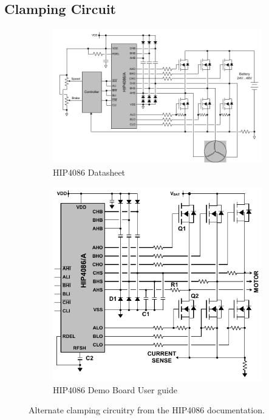 \documentclass{article}
\begin{document}
\subsection{Clamping Circuit}
\begin{figure}[h]
	\centering
	\begin{subfigure}{0.5\textwidth}
		\includegraphics[width=\textwidth]{clamp1}
		\caption{HIP4086 Datasheet}
	\end{subfigure}
	\quad
	\begin{subfigure}{0.35\textwidth}
		\includegraphics[width=\textwidth]{clamp2}
		\caption{HIP4086 Demo Board User guide}
	\end{subfigure}
	\caption{Alternate clamping circuitry from the HIP4086 documentation\protect\footnotemark.}
	\label{fig:clamping}
\end{figure}
\end{document}
